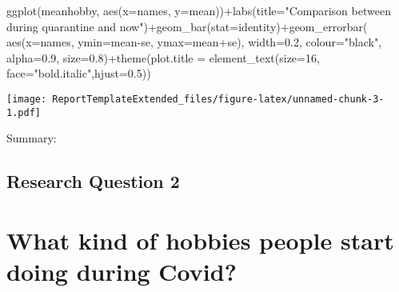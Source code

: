 \documentclass[
]{article}
\newenvironment{Shaded}{\begin{snugshade}}{\end{snugshade}}
\newcommand{\AttributeTok}[1]{\textcolor[rgb]{0.77,0.63,0.00}{#1}}
\newcommand{\DecValTok}[1]{\textcolor[rgb]{0.00,0.00,0.81}{#1}}
\newcommand{\FloatTok}[1]{\textcolor[rgb]{0.00,0.00,0.81}{#1}}
\newcommand{\FunctionTok}[1]{\textcolor[rgb]{0.00,0.00,0.00}{#1}}
\newcommand{\NormalTok}[1]{#1}
\newcommand{\SpecialCharTok}[1]{\textcolor[rgb]{0.00,0.00,0.00}{#1}}
\newcommand{\StringTok}[1]{\textcolor[rgb]{0.31,0.60,0.02}{#1}}
\begin{document}
\begin{Shaded}
\begin{Highlighting}[]
\FunctionTok{ggplot}\NormalTok{(meanhobby, }\FunctionTok{aes}\NormalTok{(}\AttributeTok{x=}\NormalTok{names, }\AttributeTok{y=}\NormalTok{mean))}\SpecialCharTok{+}\FunctionTok{labs}\NormalTok{(}\AttributeTok{title=}\StringTok{"Comparison between during quarantine and now"}\NormalTok{)}\SpecialCharTok{+}\FunctionTok{geom\_bar}\NormalTok{(}\AttributeTok{stat=}\StringTok{\textquotesingle{}identity\textquotesingle{}}\NormalTok{)}\SpecialCharTok{+}\FunctionTok{geom\_errorbar}\NormalTok{( }\FunctionTok{aes}\NormalTok{(}\AttributeTok{x=}\NormalTok{names, }\AttributeTok{ymin=}\NormalTok{mean}\SpecialCharTok{{-}}\NormalTok{se, }\AttributeTok{ymax=}\NormalTok{mean}\SpecialCharTok{+}\NormalTok{se), }\AttributeTok{width=}\FloatTok{0.2}\NormalTok{, }\AttributeTok{colour=}\StringTok{"black"}\NormalTok{, }\AttributeTok{alpha=}\FloatTok{0.9}\NormalTok{, }\AttributeTok{size=}\FloatTok{0.8}\NormalTok{)}\SpecialCharTok{+}\FunctionTok{theme}\NormalTok{(}\AttributeTok{plot.title =} \FunctionTok{element\_text}\NormalTok{(}\AttributeTok{size=}\DecValTok{16}\NormalTok{, }\AttributeTok{face=}\StringTok{"bold.italic"}\NormalTok{,}\AttributeTok{hjust=}\FloatTok{0.5}\NormalTok{))}
\end{Highlighting}
\end{Shaded}

\texttt{[image: ReportTemplateExtended\_files/figure-latex/unnamed-chunk-3-1.pdf]}

Summary:

\hypertarget{research-question-2}{%
\subsection{Research Question 2}\label{research-question-2}}

\hypertarget{what-kind-of-hobbies-people-start-doing-during-covid}{%
\section{What kind of hobbies people start doing during
Covid?}\label{what-kind-of-hobbies-people-start-doing-during-covid}}
\end{document}
